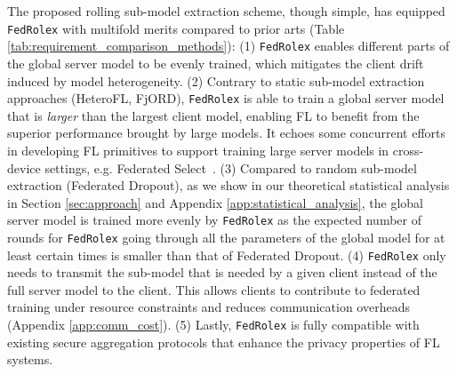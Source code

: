 \documentclass{article}
\newcommand{\Luyang}[1]{\textcolor{orange}{(Luyang: #1)}}
\newcommand{\Samiul}[1]{\textcolor{blue}{#1}}
\newcommand{\MZ}[1]{\textcolor{red}{(MZ: #1)}}
\begin{document}
%
The proposed rolling sub-model extraction scheme, though simple, has equipped \texttt{FedRolex} with multifold merits compared to prior arts (Table \ref{tab:requirement_comparison_methods}): 
%
(1) \texttt{FedRolex} enables different parts of the global server model to be evenly trained, which mitigates the client drift induced by model heterogeneity. 
(2) Contrary to static sub-model extraction approaches (HeteroFL, FjORD), \texttt{FedRolex} is able to train a global server model that is \textit{larger} than the largest client model, enabling FL to benefit from the superior performance brought by large models. It echoes some concurrent efforts in developing FL primitives to support training large server models in cross-device settings, e.g. Federated Select~\citep{charles2022federated}. 
(3) Compared to random sub-model extraction (Federated Dropout), as we show in our theoretical statistical analysis in Section \ref{sec:approach} and Appendix \ref{app:statistical_analysis}, the global server model is trained more evenly by \texttt{FedRolex}
as the expected number of rounds for \texttt{FedRolex} going through all the parameters of the global model for at least certain times is smaller than that of Federated Dropout.
(4) \texttt{FedRolex} only needs to transmit the sub-model that is needed by a given client instead of the full server model to the client. This allows clients to contribute to federated training under resource constraints and reduces communication overheads (Appendix \ref{app:comm_cost}).
(5) Lastly, \texttt{FedRolex} is fully compatible with existing secure aggregation protocols that enhance the privacy properties of FL systems.
\end{document}
